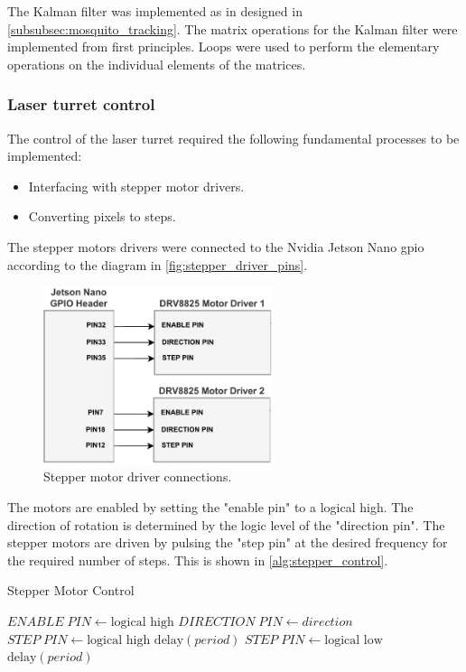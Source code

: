 The Kalman filter was implemented as in designed in \autoref{subsubsec:mosquito_tracking}. The matrix operations for the Kalman filter were implemented from first principles. Loops were used to perform the elementary operations on the individual elements of the matrices.

\subsubsection{Laser turret control}
The control of the laser turret required the following fundamental processes to be implemented:
\begin{itemize}
  \item Interfacing with stepper motor drivers.
  \item Converting pixels to steps.
\end{itemize}

The stepper motors drivers were connected to the Nvidia Jetson Nano \gls{gpio} according to the diagram in \autoref{fig:stepper_driver_pins}.
\begin{figure}[!htb]
  \centering
  \includegraphics[width=0.6\textwidth]{figures/stepper_driver_pins.pdf}
  \caption{Stepper motor driver connections.}
  \label{fig:stepper_driver_pins}
\end{figure}
The motors are enabled by setting the "enable pin" to a logical high. The direction of rotation is determined by the logic level of the "direction pin". The stepper motors are driven by pulsing the "step pin" at the desired frequency for the required number of steps. This is shown in \autoref{alg:stepper_control}.
\begin{algorithm}[!htb]
  \caption{Stepper Motor Control}
  \label{alg:stepper_control}
  \begin{algorithmic}[1]
    \State $ENABLE\;PIN \gets \text{logical high}$
    \State $DIRECTION\;PIN \gets direction$
    \State $STEP\;PIN \gets \text{logical high}$
    \State $\text{delay}(period)$
    \State $STEP\;PIN \gets \text{logical low}$
    \State $\text{delay}(period)$
    \EndFor
  \end{algorithmic}
\end{algorithm}


